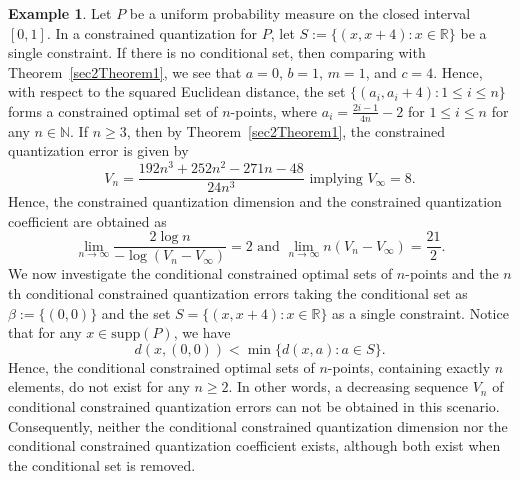 \documentclass[12pt, reqno]{amsart}
\theoremstyle{plain}
\theoremstyle{definition}
\newtheorem{exam}[subsection]{Example}
\newcommand{\set}[1]{\{#1\}}%
\newcommand{\gb}{\beta}
\newcommand{\D}[1]{\mathbb{#1}}%
\newcommand{\te}{\text}%
\begin{document}
\begin{exam} \label{exam2} 
 Let $P$ be a uniform probability measure on the closed interval $[0, 1]$. In a constrained quantization for $P$, let $S:=\set{(x, x+4) : x\in \D R}$ be a single constraint. If there is no conditional set, then comparing with Theorem~\ref{sec2Theorem1}, we see that 
$a=0, \, b=1, \, m=1$, and $c=4$. Hence, with respect to the squared Euclidean distance, the set $\{(a_i,   a_i+4): 1\leq i \leq n\}$ forms a constrained optimal set of $n$-points, where $a_i=\frac{2 i-1}{4 n}-2$ for $1\leq i\leq n$ for any $n\in \D N$. If $n\geq 3$, then by Theorem~\ref{sec2Theorem1}, the constrained quantization error is given by 
\[V_n=\frac{192 n^3+252 n^2-271 n-48}{24 n^3} \te{ implying } V_\infty=8.\]
Hence, the constrained quantization dimension and the constrained quantization coefficient are obtained as 
\begin{equation}
\lim_{n\to \infty}\frac{2\log n}{-\log (V_n-V_\infty)}=2 \te{ and } \lim_{n\to\infty} n(V_n-V_\infty)=\frac{21}{2}.
\end{equation} 
We now investigate the conditional constrained optimal sets of $n$-points and the $n$th conditional constrained quantization errors taking the conditional set as $\gb:=\set{(0, 0)}$ and the set $S=\set{(x, x+4) : x\in \D R}$ as a single constraint. Notice that for any $x\in \te{supp}(P)$, we have
\[d(x, (0, 0))<\min \set{d(x, a) : a \in S}.\]
Hence, the conditional constrained optimal sets of 
$n$-points, containing exactly $n$ elements, do not exist for any $n\geq 2$. In other words, a decreasing sequence $V_n$ of conditional constrained quantization errors can not be obtained in this scenario. Consequently, neither the conditional constrained quantization dimension nor the conditional constrained quantization coefficient exists, although both exist when the conditional set is removed. 
 \end{exam} 
\end{document}
